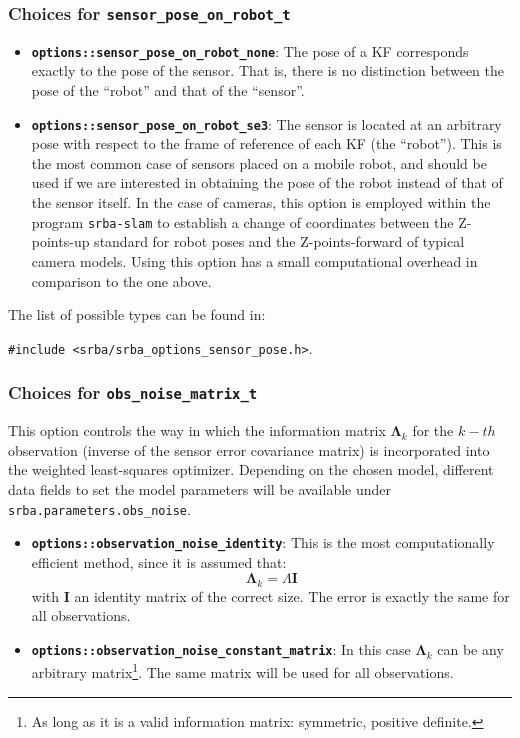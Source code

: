 \documentclass[a4paper,11pt]{article}
\begin{document}
\subsubsection{Choices for \texttt{sensor\_pose\_on\_robot\_t}}

\begin{itemize}
\item{\textbf{ \texttt{options::sensor\_pose\_on\_robot\_none}}: The pose of a KF corresponds exactly to the pose of the 
sensor. That is, 
there is no distinction between the pose of the ``robot'' and that of the ``sensor''.}
\item{\textbf{ \texttt{options::sensor\_pose\_on\_robot\_se3}}: The sensor is located at an arbitrary pose with respect to 
the frame of reference of each KF (the ``robot''). This is the most common case of sensors placed on a mobile robot, 
and should be used if we are interested in obtaining the pose of the robot instead of that of the sensor itself. 
In the case of cameras, this option is employed within the program \texttt{srba-slam} to establish a change of coordinates
between the Z-points-up standard for robot poses and the Z-points-forward of typical camera models. 
Using this option has a small computational overhead in comparison to the one above.}
\end{itemize}

The list of possible types can be found in: 

\texttt{\#include <srba/srba\_options\_sensor\_pose.h>}.


\subsubsection{Choices for \texttt{obs\_noise\_matrix\_t}}

This option controls the way in which the information matrix $\boldsymbol \Lambda_k$ for the $k-th$ observation 
(inverse of the sensor error
covariance matrix) is incorporated into the weighted least-squares optimizer.
Depending on the chosen model, different data fields to set the model parameters 
will be available under \texttt{srba.parameters.obs\_noise}.

\begin{itemize}
\item{\textbf{ \texttt{options::observation\_noise\_identity}}: 
This is the most computationally efficient method, since it is assumed that:
  \begin{equation}
  \boldsymbol \Lambda_k = \Lambda \mathbf{I}
  \end{equation}
\noindent with $\mathbf{I}$ an identity matrix of the correct size. 
The error is exactly the same for all observations.}

\item{\textbf{ \texttt{options::observation\_noise\_constant\_matrix}}: 
In this case $\boldsymbol \Lambda_k$ can be any arbitrary matrix\footnote{As long
as it is a valid information matrix: symmetric, positive definite.}. The same 
matrix will be used for all observations.}

\end{itemize}
\end{document}
